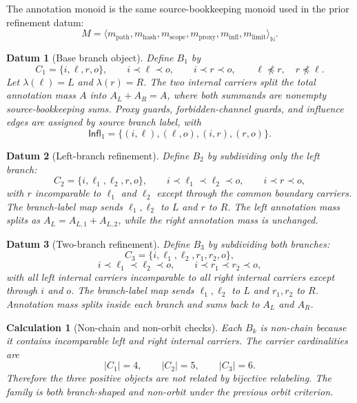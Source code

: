 \documentclass[11pt]{article}
\newcommand{\Infl}{\mathsf{Infl}}
\newtheorem{datum}{Datum}
\newtheorem{calculation}{Calculation}
\begin{document}
The annotation monoid is the same source-bookkeeping monoid used in the
prior refinement datum:
\[
    M=\langle
    m_{\mathrm{path}},m_{\mathrm{hash}},m_{\mathrm{scope}},
    m_{\mathrm{proxy}},m_{\mathrm{infl}},m_{\mathrm{limit}}
    \rangle_{\mathbb{N}}.
\]

\begin{datum}[Base branch object]
Define \(B_{1}\) by
\[
    C_{1}=\{i,\ell,r,o\},\qquad
    i\prec \ell\prec o,\qquad i\prec r\prec o,
    \qquad \ell\npreceq r,\quad r\npreceq \ell.
\]
Let \(\lambda(\ell)=L\) and \(\lambda(r)=R\). The two internal carriers
split the total annotation mass \(A\) into \(A_{L}+A_{R}=A\), where both
summands are nonempty source-bookkeeping sums. Proxy guards,
forbidden-channel guards, and influence edges are assigned by source
branch label, with
\[
    \Infl_{1}=\{(i,\ell),(\ell,o),(i,r),(r,o)\}.
\]
\end{datum}

\begin{datum}[Left-branch refinement]
Define \(B_{2}\) by subdividing only the left branch:
\[
    C_{2}=\{i,\ell_{1},\ell_{2},r,o\},\qquad
    i\prec \ell_{1}\prec \ell_{2}\prec o,\qquad
    i\prec r\prec o,
\]
with \(r\) incomparable to \(\ell_{1}\) and \(\ell_{2}\) except through
the common boundary carriers. The branch-label map sends
\(\ell_{1},\ell_{2}\) to \(L\) and \(r\) to \(R\). The left annotation
mass splits as \(A_{L}=A_{L,1}+A_{L,2}\), while the right annotation mass
is unchanged.
\end{datum}

\begin{datum}[Two-branch refinement]
Define \(B_{3}\) by subdividing both branches:
\[
    C_{3}=\{i,\ell_{1},\ell_{2},r_{1},r_{2},o\},
\]
\[
    i\prec \ell_{1}\prec \ell_{2}\prec o,\qquad
    i\prec r_{1}\prec r_{2}\prec o,
\]
with all left internal carriers incomparable to all right internal
carriers except through \(i\) and \(o\). The branch-label map sends
\(\ell_{1},\ell_{2}\) to \(L\) and \(r_{1},r_{2}\) to \(R\). Annotation
mass splits inside each branch and sums back to \(A_{L}\) and \(A_{R}\).
\end{datum}

\begin{calculation}[Non-chain and non-orbit checks]
Each \(B_{k}\) is non-chain because it contains incomparable left and
right internal carriers. The carrier cardinalities are
\[
    |C_{1}|=4,\qquad |C_{2}|=5,\qquad |C_{3}|=6.
\]
Therefore the three positive objects are not related by bijective
relabeling. The family is both branch-shaped and non-orbit under the
previous orbit criterion.
\end{calculation}
\end{document}
